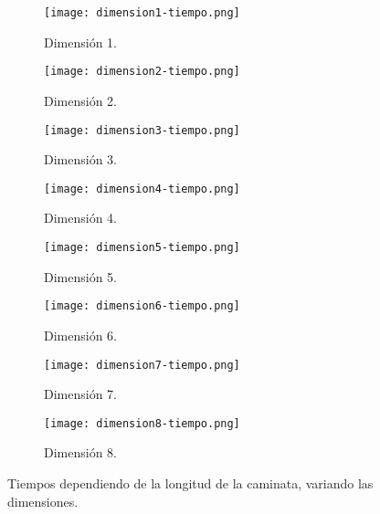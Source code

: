 \documentclass[12pt,letterpaper]{article}
\begin{document}
\begin{figure}
 	 \centering
 	 \begin{subfigure}[b]{0.3\linewidth}
 		 \texttt{[image: dimension1-tiempo.png]} 		
 		 \caption{Dimensión 1.}
 		 	 	\label{tiempos-dim1}
 	 \end{subfigure}
 	 \begin{subfigure}[b]{0.3\linewidth}

 		 \texttt{[image: dimension2-tiempo.png]} 		
 		 \caption{Dimensión 2.}
 		 \label{tiempos-dim2}
 	 \end{subfigure}
  	\begin{subfigure}[b]{0.3\linewidth}
 		 \texttt{[image: dimension3-tiempo.png]}
 	 	\caption{Dimensión 3.}
 	 	\label{tiempos-dim3}
  	\end{subfigure}
 	\begin{subfigure}[b]{0.3\linewidth} 		
  		\texttt{[image: dimension4-tiempo.png]}
  		\caption{Dimensión 4.}
  		\label{tiempos-dim4}
  	\end{subfigure}
  		\begin{subfigure}[b]{0.3\linewidth}
  		\texttt{[image: dimension5-tiempo.png]} 		
  		\caption{Dimensión 5.}
  		\label{tiempos-dim5}
  	\end{subfigure}
 	 	\begin{subfigure}[b]{0.3\linewidth}
 		 \texttt{[image: dimension6-tiempo.png]}
 		 \caption{Dimensión 6.}
 		 \label{tiempos-dim6}
 	 \end{subfigure}
 		 \begin{subfigure}[b]{0.3\linewidth} 		
 		 \texttt{[image: dimension7-tiempo.png]}
 		 \caption{Dimensión 7.}
 		 \label{tiempos-dim7}
 	 \end{subfigure}
 		 \begin{subfigure}[b]{0.3\linewidth}
 		 \texttt{[image: dimension8-tiempo.png]}
 	 	\caption{Dimensión 8.}
 	 	\label{tiempos-dim8}
  	\end{subfigure}
  	\caption{Tiempos dependiendo de la longitud de la caminata, variando las dimensiones.}
  	  \label{tiempos-dimension}
  \end{figure}
  
  
  


\end{document}
